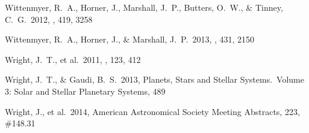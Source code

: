 \documentclass[11pt,preprint]{aastex}
\begin{document}
\begin{CJK*}{UTF8}{gbsn}
\begin{thebibliography}
 Wittenmyer, R.~A., 
Horner, J., Marshall, J.~P., Butters, O.~W., 
\& Tinney, C.~G.\ 2012, \mnras, 419, 3258 %

 Wittenmyer, R.~A., 
Horner, J., \& Marshall, J.~P.\ 2013, \mnras, 431, 2150 %

 Wright, J.~T., et al.\ 2011,
  \pasp, 123, 412 %

 Wright, J.~T., \& Gaudi, B.~S.\ 2013,
  Planets, Stars and Stellar Systems.~Volume 3: Solar and Stellar
  Planetary Systems, 489 %

 Wright, J., et al.\ 2014, 
American Astronomical Society Meeting Abstracts, 223, \#148.31

\end{thebibliography}



\clearpage


\end{CJK*}
\end{document}

